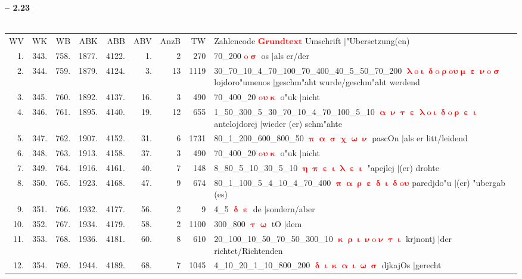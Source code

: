 \documentclass[a4paper,10pt,landscape]{article}
\begin{document}
\newpage 
{\bf -- 2.23}\\
\medskip \\
\begin{tabular}{rrrrrrrrp{120mm}}
WV&WK&WB&ABK&ABB&ABV&AnzB&TW&Zahlencode \textcolor{red}{$\boldsymbol{Grundtext}$} Umschrift $|$"Ubersetzung(en)\\
1.&343.&758.&1877.&4122.&1.&2&270&70\_200 \textcolor{red}{$\boldsymbol{\mathrm{o}\upsigma}$} os $|$als er/der\\
2.&344.&759.&1879.&4124.&3.&13&1119&30\_70\_10\_4\_70\_100\_70\_400\_40\_5\_50\_70\_200 \textcolor{red}{$\boldsymbol{\uplambda\mathrm{o}\upiota\updelta\mathrm{o}\uprho\mathrm{o}\upsilon\upmu\upepsilon\upnu\mathrm{o}\upsigma}$} lojdoro"umenos $|$geschm"aht wurde/geschm"aht werdend\\
3.&345.&760.&1892.&4137.&16.&3&490&70\_400\_20 \textcolor{red}{$\boldsymbol{\mathrm{o}\upsilon\upkappa}$} o"uk $|$nicht\\
4.&346.&761.&1895.&4140.&19.&12&655&1\_50\_300\_5\_30\_70\_10\_4\_70\_100\_5\_10 \textcolor{red}{$\boldsymbol{\upalpha\upnu\uptau\upepsilon\uplambda\mathrm{o}\upiota\updelta\mathrm{o}\uprho\upepsilon\upiota}$} antelojdorej $|$wieder (er) schm"ahte\\
5.&347.&762.&1907.&4152.&31.&6&1731&80\_1\_200\_600\_800\_50 \textcolor{red}{$\boldsymbol{\uppi\upalpha\upsigma\upchi\upomega\upnu}$} pascOn $|$als er litt/leidend\\
6.&348.&763.&1913.&4158.&37.&3&490&70\_400\_20 \textcolor{red}{$\boldsymbol{\mathrm{o}\upsilon\upkappa}$} o"uk $|$nicht\\
7.&349.&764.&1916.&4161.&40.&7&148&8\_80\_5\_10\_30\_5\_10 \textcolor{red}{$\boldsymbol{\upeta\uppi\upepsilon\upiota\uplambda\upepsilon\upiota}$} "apejlej $|$(er) drohte\\
8.&350.&765.&1923.&4168.&47.&9&674&80\_1\_100\_5\_4\_10\_4\_70\_400 \textcolor{red}{$\boldsymbol{\uppi\upalpha\uprho\upepsilon\updelta\upiota\updelta\mathrm{o}\upsilon}$} paredjdo"u $|$(er) "ubergab (es)\\
9.&351.&766.&1932.&4177.&56.&2&9&4\_5 \textcolor{red}{$\boldsymbol{\updelta\upepsilon}$} de $|$sondern/aber\\
10.&352.&767.&1934.&4179.&58.&2&1100&300\_800 \textcolor{red}{$\boldsymbol{\uptau\upomega}$} tO $|$dem\\
11.&353.&768.&1936.&4181.&60.&8&610&20\_100\_10\_50\_70\_50\_300\_10 \textcolor{red}{$\boldsymbol{\upkappa\uprho\upiota\upnu\mathrm{o}\upnu\uptau\upiota}$} krjnontj $|$der richtet/Richtenden\\
12.&354.&769.&1944.&4189.&68.&7&1045&4\_10\_20\_1\_10\_800\_200 \textcolor{red}{$\boldsymbol{\updelta\upiota\upkappa\upalpha\upiota\upomega\upsigma}$} djkajOs $|$gerecht\\
\end{tabular}\medskip \\
\end{document}
